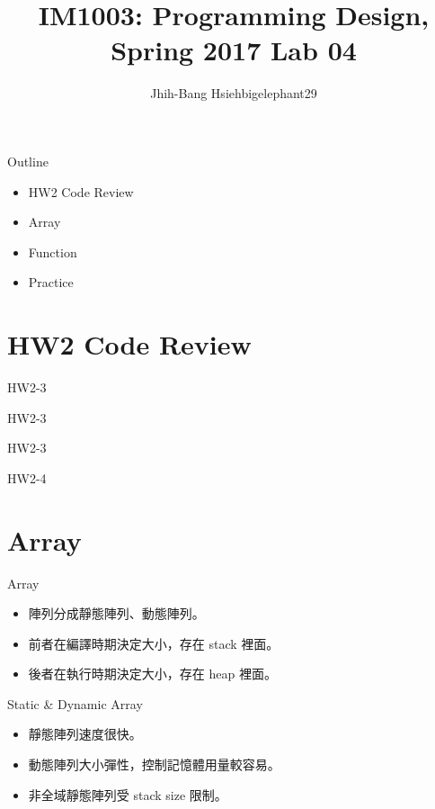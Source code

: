 \documentclass[t]{beamer}
\title{IM1003: Programming Design, Spring 2017  \linebreak Lab 04}
\author[bigelephant29]{Jhih-Bang Hsieh\linebreak \small{bigelephant29}}
\institute{\textbf{National Taiwan University}}
\date{}
\begin{document}
\begin{frame}
  \maketitle
\end{frame}

\begin{frame}{Outline}
  \begin{itemize}
    \item HW2 Code Review
    \item Array
    \item Function
    \item Practice
  \end{itemize}
\end{frame}

\section{HW2 Code Review}
\begin{frame}{HW2-3}
  
\end{frame}

\begin{frame}{HW2-3}
  
\end{frame}

\begin{frame}{HW2-3}
  
\end{frame}

\begin{frame}{HW2-4}
  
\end{frame}

\section{Array}
\begin{frame}{Array}
  \begin{itemize}
    \item 陣列分成靜態陣列、動態陣列。
    \item 前者在編譯時期決定大小，存在 stack 裡面。
    \item 後者在執行時期決定大小，存在 heap 裡面。
  \end{itemize}
\end{frame}

\begin{frame}{Static \& Dynamic Array}
  \begin{itemize}
    \item 靜態陣列速度很快。
    \item 動態陣列大小彈性，控制記憶體用量較容易。
    \item 非全域靜態陣列受 stack size 限制。
  \end{itemize}
\end{frame}
\end{document}
